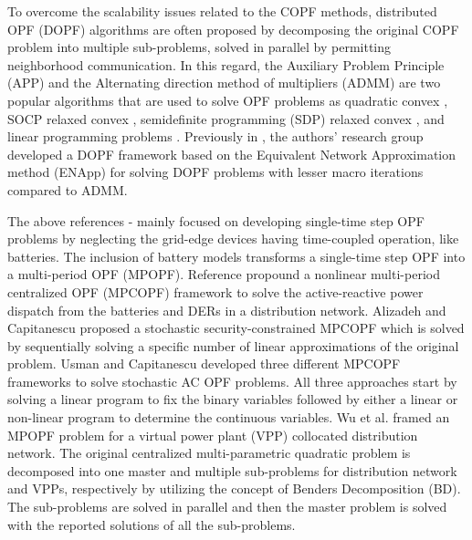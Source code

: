 \documentclass{article}
\begin{document}
To overcome the scalability issues related to the COPF methods, distributed OPF (DOPF) algorithms are often proposed by decomposing the original COPF problem into multiple sub-problems, solved in parallel by permitting neighborhood communication. In this regard, the Auxiliary Problem Principle (APP) and the Alternating direction method of multipliers (ADMM) are two popular algorithms that are used to solve OPF problems as quadratic convex \cite{Fazio}, SOCP relaxed convex \cite{Zheng}, semidefinite programming (SDP) relaxed convex \cite{Wang, Biswas}, and linear programming problems \cite{Paul2}. Previously in \cite{Sadnan}, the authors' research group developed a DOPF framework based on the Equivalent Network Approximation method (ENApp) for solving DOPF problems with lesser macro iterations compared to ADMM.



The above references \cite{Wei}-\cite{Paul2} mainly focused on developing single-time step OPF problems by neglecting the grid-edge devices having time-coupled operation, like batteries. The inclusion of battery models transforms a single-time step OPF into a multi-period OPF (MPOPF). Reference \cite{Gabash} propound a nonlinear multi-period centralized OPF (MPCOPF) framework to solve the active-reactive power dispatch from the batteries and DERs in a distribution network. Alizadeh and Capitanescu \cite{Alizadeh} proposed a stochastic security-constrained MPCOPF which is solved by sequentially solving a specific number of linear approximations of the original problem. Usman and Capitanescu \cite{Usman} developed three different MPCOPF frameworks to solve stochastic AC OPF problems. All three approaches start by solving a linear program to fix the binary variables followed by either a linear or non-linear program to determine the continuous variables. Wu et al. \cite{Wu} framed an MPOPF problem for a virtual power plant (VPP) collocated distribution network. The original centralized multi-parametric quadratic problem is decomposed into one master and multiple sub-problems for distribution network and VPPs, respectively by utilizing the concept of Benders Decomposition (BD). The sub-problems are solved in parallel and then the master problem is solved with the reported solutions of all the sub-problems. 
\end{document}
